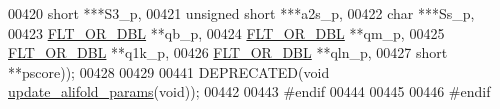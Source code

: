 \begin{DoxyCode}
00420                      \textcolor{keywordtype}{short} ***S3\_p,
00421                      \textcolor{keywordtype}{unsigned} \textcolor{keywordtype}{short} ***a2s\_p,
00422                      \textcolor{keywordtype}{char} ***Ss\_p,
00423                      \hyperlink{group__data__structures_ga31125aeace516926bf7f251f759b6126}{FLT\_OR\_DBL} **qb\_p,
00424                      \hyperlink{group__data__structures_ga31125aeace516926bf7f251f759b6126}{FLT\_OR\_DBL} **qm\_p,
00425                      \hyperlink{group__data__structures_ga31125aeace516926bf7f251f759b6126}{FLT\_OR\_DBL} **q1k\_p,
00426                      \hyperlink{group__data__structures_ga31125aeace516926bf7f251f759b6126}{FLT\_OR\_DBL} **qln\_p,
00427                      \textcolor{keywordtype}{short} **pscore));
00428 
00429 
00441 DEPRECATED(\textcolor{keywordtype}{void} \hyperlink{group__consensus__fold_gac484c6bd429bafbd353b91044508d8e9}{update\_alifold\_params}(\textcolor{keywordtype}{void}));
00442 
00443 \textcolor{preprocessor}{#endif}
00444 
00445 
00446 \textcolor{preprocessor}{#endif}
\end{DoxyCode}
